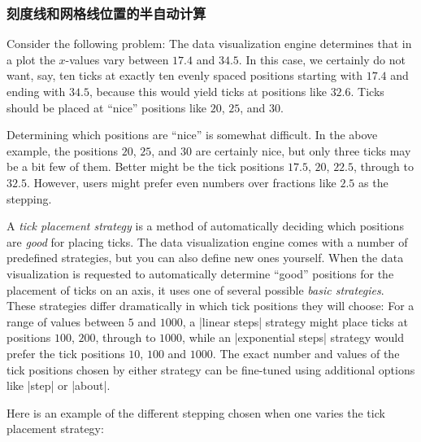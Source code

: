 \subsubsection{刻度线和网格线位置的半自动计算}
\label{section-dv-concept-tick-placement-strategies}

Consider the following problem: The data visualization engine determines that in a plot the $x$-values vary between $17.4$ and $34.5$. In this case, we certainly do not want, say, ten ticks at exactly ten evenly spaced positions starting with $17.4$ and ending with $34.5$, because this would yield ticks at positions like $32.6$. Ticks should be placed at ``nice'' positions like $20$, $25$, and $30$.

Determining which positions are ``nice'' is somewhat difficult. In the above example, the positions $20$, $25$, and $30$ are certainly nice, but only three ticks may be a bit few of them. Better might be the tick positions $17.5$, $20$, $22.5$, through to $32.5$. However, users might prefer even numbers over fractions like $2.5$ as the stepping.

A \emph{tick placement strategy} is a method of automatically deciding which positions are \emph{good} for placing ticks. The data visualization engine comes with a number of predefined strategies, but you can also define new ones yourself. When the data visualization is requested to automatically determine ``good'' positions for the placement of ticks on an axis, it uses one of several possible \emph{basic strategies}. These strategies differ dramatically in which tick positions they will choose: For a range of values between $5$ and $1000$, a |linear steps| strategy might place ticks at positions $100$, $200$, through to $1000$, while an |exponential steps| strategy would prefer the tick positions $10$, $100$ and $1000$. The exact number and values of the tick positions chosen by either strategy can be fine-tuned using additional options like |step| or |about|.

Here is an example of the different stepping chosen when one varies the tick placement strategy:
%
\begin{codeexample}[preamble={\usetikzlibrary{datavisualization.formats.functions}}]
\qquad
{}
\end{codeexample}

